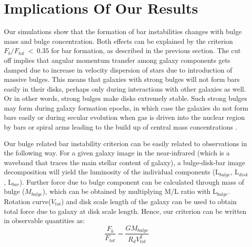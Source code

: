 \documentclass[a4paper,fleqn,usenatbib,useAMS]{mnras}
\begin{document}
\section{Implications Of Our Results}\label{Discussion}
Our simulations show that the formation of bar instabilities changes 
with bulge mass and bulge concentration. Both effects can be explained by the criterion $F_{b}/F_{tot}~<~0.35$ for bar formation, as described in the previous section. The cut off implies that angular momentum transfer among galaxy components gets damped due to increase in velocity dispersion of stars due to introduction of massive bulges. This means that galaxies with strong bulges will not form bars easily in their disks, perhaps only during interactions with other galaxies as well. Or in other words, strong bulges make disks extremely stable. Such strong bulges may form during galaxy formation epochs, in which case the galaxies do not form bars easily or during secular evolution when gas is driven into the nuclear region by bars or spiral arms leading to the build up of central mass concentrations \citep{58,59,60}.  

 Our bulge related bar instability criterion can be easily related to observations in the following way. For a given galaxy image in the near-infrared (which is a waveband that traces the main stellar content of galaxy), a bulge-disk-bar image decomposition will yield the luminosity of the individual components (L$_ {bulge}$, L$_{disk}$, L$_{bar}$). Further force due to bulge component can be calculated through mass of bulge ($M_{bulge}$), which can be obtained by multiplying M/L ratio with L$_ {bulge}$. Rotation curve($V_{tot}$) and disk scale length of the galaxy can be used to obtain total force due to galaxy at disk scale length. Hence, our criterion can be written in observable quantities as:   
 \begin{equation}
     \dfrac{F_b}{F_{tot}} = \dfrac{GM_{bulge}}{R_d V^2_{tot}}
\end{equation}
 
\end{document}
